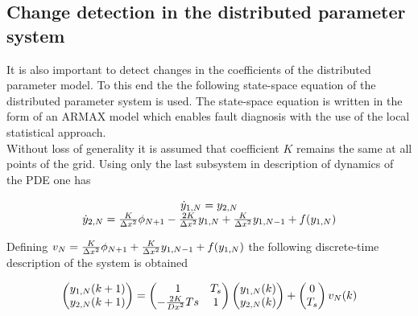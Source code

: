 \documentclass[journal]{IEEEtran}
\begin{document}
\subsection{Change detection in the distributed parameter system\\}

\noindent It is also important to detect changes in the coefficients  of the distributed parameter model. To this end the the following state-space equation of the distributed parameter system is used. The state-space equation is written in the form of an ARMAX model which enables fault diagnosis with the use of the local statistical approach. \\

\noindent Without loss of generality it is assumed that coefficient $K$ remains the same
at all points of the grid. Using only the last subsystem in description of dynamics of the PDE one has

\begin{equation}
\begin{tabular}{c}
$\dot{y}_{1,N}=y_{2,N}$ \\
$\dot{y}_{2,N}={{K} \over {{\Delta}x^2}}\phi_{N+1}-{{2K} \over {{\Delta}x^2}}y_{1,N}+{{K} \over {{\Delta}x^2}}y_{1,N-1}+f(y_{1,N})$
\end{tabular}
\end{equation}

\noindent Defining $v_N={{K} \over {{\Delta}x^2}}\phi_{N+1}+{{K} \over {{\Delta}x^2}}y_{1,N-1}+f(y_{1,N})$ the following discrete-time description of the system is obtained

\begin{equation}  \label{discrete_state_space_model1}
\begin{tabular}{c}
$\begin{pmatrix}
y_{1,N}(k+1) \\
y_{2,N}(k+1)
\end{pmatrix}=
\begin{pmatrix}
1 & T_s \\
-{{2K} \over {Dx}^2}Ts & 1
\end{pmatrix}
\begin{pmatrix}
y_{1,N}(k) \\
y_{2,N}(k)
\end{pmatrix}+
\begin{pmatrix}
0 \\
T_s
\end{pmatrix}v_N(k)
$
\end{tabular}
\end{equation}
\end{document}
